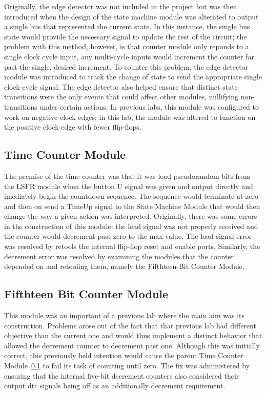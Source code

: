 \documentclass[stu,12pt,floatsintext]{apa7}
\begin{document}
Originally, the edge detector was not included in the project but was then introduced when the design of the state machine module was alterated to output a single bus that represented the current state. In this instance, the single bus state would provide the necessary signal to update the rest of the circuit; the problem with this method, however, is that counter module only reponds to a single clock cycle input, any multi-cycle inputs would increment the counter far past the single, desired increment. To counter this problem, the edge detector module was introduced to track the change of state to send the appropriate single clock-cycle signal. The edge detector also helped ensure that distinct state transitions were the only events that could affect other modules, nullifying non-transitions under certain actions. In previous labs, this module was configured to work on negative clock edges; in this lab, the module was altered to function on the positive clock edge with fewer flip-flops.

\subsection{Time Counter Module}
\label{subsec:time_counter_module}

The premise of the time counter was that it was load pseudorandom bits from the LSFR module when the button U signal was given and output directly and imediately begin the countdown sequence. The sequence would terminate at zero and then on send a TimeUp signal to the State Machine Module that would then change the way a given action was interpreted. Originally, there was some errors in the construction of this module: the load signal was not properly received and the counter would decrement past zero to the max value. The load signal error was resolved by retools the internal flip-flop reset and enable ports. Similarly, the decrement error was resolved by examining the modules that the counter depended on and retooling them, namely the Fifthteen-Bit Counter Module. 

\subsection{Fifthteen Bit Counter Module}
\label{subsec:fifthteen-bit_counter_module}

This module was an important of a previous lab where the main aim was its construction. Problems arose out of the fact that that previous lab had different objective than the current one and would thus implement a distinct behavior that allowed the decrement counter to decrement past one. Although this was initially correct, this previously held intention would cause the parent Time Counter Module~\ref{subsec:time_counter_module} to fail its task of counting until zero. The fix was administered by ensuring that the internal five-bit decrement counters also considered their output dtc signals being off as an additionally decrement requirement.
\end{document}
